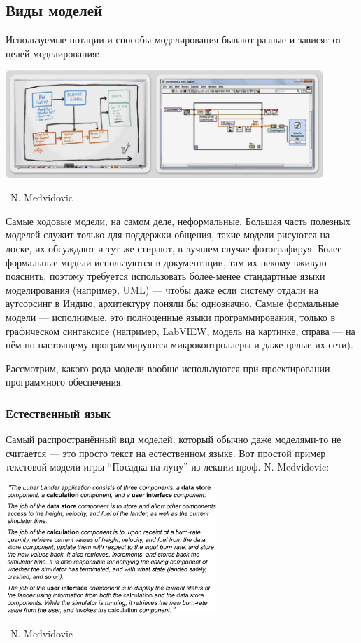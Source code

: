 \documentclass[a5paper]{article}
\newcommand{\attribution}[1] {
	\vspace{-5mm}\begin{flushright}\begin{scriptsize}%
	{\textcopyright\, #1}\end{scriptsize}\end{flushright}
}
\begin{document}
\subsection{Виды моделей}

Используемые нотации и способы моделирования бывают разные и зависят от целей моделирования:

\begin{center}
	\includegraphics[width=0.9\textwidth]{sketchesVsFormalNotations.png}
	\attribution{N. Medvidovic}
\end{center}

Самые ходовые модели, на самом деле, неформальные. Большая часть полезных моделей служит только для поддержки общения, такие модели рисуются на доске, их обсуждают и тут же стирают, в лучшем случае фотографируя. Более формальные модели используются в документации, там их некому вживую пояснить, поэтому требуется использовать более-менее стандартные языки моделирования (например, UML) --- чтобы даже если систему отдали на аутсорсинг в Индию, архитектуру поняли бы однозначно. Самые формальные модели --- исполнимые, это полноценные языки программирования, только в графическом синтаксисе (например, LabVIEW, модель на картинке, справа --- на нём по-настоящему программируются микроконтроллеры и даже целые их сети).

Рассмотрим, какого рода модели вообще используются при проектировании программного обеспечения.

\subsubsection{Естественный язык}

Самый распространённый вид моделей, который обычно даже моделями-то не считается --- это просто текст на естественном языке. Вот простой пример текстовой модели игры ``Посадка на луну'' из лекции проф. N. Medvidovic:

\begin{center}
	\includegraphics[width=0.6\textwidth]{naturalLanguage.png}
	\attribution{N. Medvidovic}
\end{center}
\end{document}
